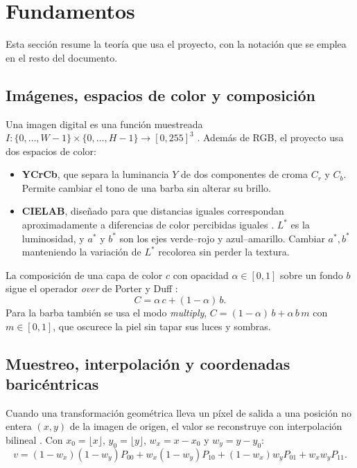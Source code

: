\section{Fundamentos}
\label{sec:fundamentos}

Esta sección resume la teoría que usa el proyecto, con la notación que se emplea en el resto del documento.

\subsection{Imágenes, espacios de color y composición}

Una imagen digital es una función muestreada $I:\{0,\dots,W-1\}\times\{0,\dots,H-1\}\to[0,255]^3$ \cite{gonzalez2018}. Además de RGB, el proyecto usa dos espacios de color:
\begin{itemize}
  \item \textbf{YCrCb}, que separa la luminancia $Y$ de dos componentes de croma $C_r$ y $C_b$. Permite cambiar el tono de una barba sin alterar su brillo.
  \item \textbf{CIELAB}, diseñado para que distancias iguales correspondan aproximadamente a diferencias de color percibidas iguales \cite{cie2004,fairchild2013}. $L^*$ es la luminosidad, y $a^*$ y $b^*$ son los ejes verde--rojo y azul--amarillo. Cambiar $a^*,b^*$ manteniendo la variación de $L^*$ recolorea sin perder la textura.
\end{itemize}

La composición de una capa de color $c$ con opacidad $\alpha\in[0,1]$ sobre un fondo $b$ sigue el operador \emph{over} de Porter y Duff \cite{porter1984}:
\begin{equation}
  C = \alpha\,c + (1-\alpha)\,b.
\end{equation}
Para la barba también se usa el modo \emph{multiply}, $C=(1-\alpha)\,b+\alpha\,b\,m$ con $m\in[0,1]$, que oscurece la piel sin tapar sus luces y sombras.

\subsection{Muestreo, interpolación y coordenadas baricéntricas}

Cuando una transformación geométrica lleva un píxel de salida a una posición no entera $(x,y)$ de la imagen de origen, el valor se reconstruye con interpolación bilineal \cite{marschner2016}. Con $x_0=\lfloor x\rfloor$, $y_0=\lfloor y\rfloor$, $w_x=x-x_0$ y $w_y=y-y_0$:
\begin{equation}
  v=(1-w_x)(1-w_y)P_{00}+w_x(1-w_y)P_{10}+(1-w_x)w_yP_{01}+w_xw_yP_{11}.
\end{equation}

